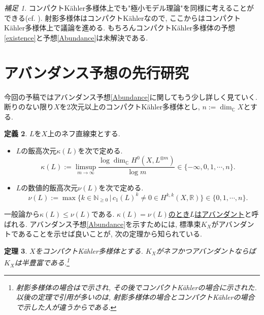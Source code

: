\documentclass[12pt]{amsart}
\newtheorem{thm}{定理}[section]
\theoremstyle{definition}
\newtheorem{defn}[thm]{定義}
\theoremstyle{remark}
\newtheorem{rem}[thm]{補足}
\newcommand{\R}{\mathbb{R}}
\newcommand{\N}{\mathbb{N}}
\newcommand{\C}{\mathbb{C}}
\begin{document}
\begin{rem}
コンパクトK\"ahler多様体上でも"極小モデル理論"を同様に考えることができる(cf. \cite{HP16} \cite{CHP13}). 射影多様体はコンパクトK\"ahlerなので, ここからはコンパクトK\"ahler多様体上で議論を進める. もちろんコンパクトK\"ahler多様体の予想\ref{existence}と予想\ref{Abundance}は未解決である. 
\end{rem}

\section{アバンダンス予想の先行研究}
\label{Abundance_research}
今回の予稿ではアバンダンス予想\ref{Abundance}に関してもう少し詳しく見ていく. 
断りのない限り$X$を2次元以上のコンパクトK\"ahler多様体とし, $n := \dim_{\C} X$とする.
\begin{defn}
$L$を$X$上のネフ直線束とする.%
\begin{itemize}
\item $L$の飯高次元$\kappa(L)$を次で定める.
$$
\kappa(L) := \limsup_{m \rightarrow \infty} \frac{\log \dim_{\C} H^0 (X , L^{\otimes m})}{\log m}
\in \{-\infty, 0, 1, \cdots, n\}.
$$
\item $L$の数値的飯高次元$\nu(L)$を次で定める.
$$
\nu(L) := \max \{ k \in \N_{\ge 0} \,|\,  c_1(L)^k \neq 0 \in H^{k,k}(X, \R)\}
\in \{0, 1, \cdots, n\}.
$$
\end{itemize}
\end{defn}
一般論から$\kappa(L) \le \nu(L)$である. \underline{$\kappa(L)= \nu(L)$のとき$L$はアバンダント}と呼ばれる. アバンダンス予想\ref{Abundance}を示すためには, 標準束$K_X$がアバンダントであることを示せば良いことが, 次の定理から知られている.
\begin{thm}\cite{Kaw85}\cite{Nak92}
\label{Good}
$X$をコンパクトK\"ahler多様体とする.
 $K_X$がネフかつアバンダントならば$K_X$は半豊富である.\footnote{射影多様体の場合は\cite{Kaw85}で示され, その後\cite{Nak92}でコンパクトK\"ahlerの場合に示された. 以後の定理で引用が多いのは, 射影多様体の場合とコンパクトK\"ahlerの場合で示した人が違うからである. }
\end{thm}
\end{document}
